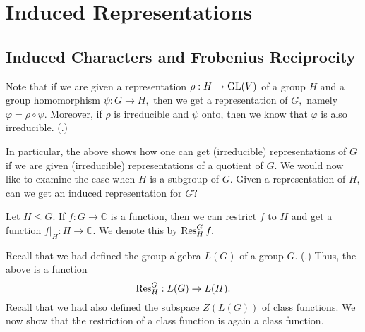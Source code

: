 \section{Induced Representations}
\subsection{Induced Characters and Frobenius Reciprocity}

Note that if we are given a representation $\rho : H \to \operatorname{GL}(V)$ of a group $H$ and a group homomorphism $\psi : G \to H,$ then we get a representation of $G,$ namely $\varphi = \rho \circ \psi.$ Moreover, if $\rho$ is irreducible and $\psi$ onto, then we know that $\varphi$ is also irreducible. (.) 

In particular, the above shows how one can get (irreducible) representations of $G$ if we are given (irreducible) representations of a quotient of $G.$ We would now like to examine the case when $H$ is a subgroup of $G.$ Given a representation of $H,$ can we get an induced representation for $G?$

\begin{defn}%
	Let $H \le G.$ If $f : G \to \mathbb{C}$ is a function, then we can restrict $f$ to $H$ and get a function $f|_H : H \to \mathbb{C}.$ We denote this  by $\operatorname{Res}^{G}_{H}f.$
\end{defn}

Recall that we had defined the group algebra $L(G)$ of a group $G.$ (.) Thus, the above is a function
\begin{equation*} 
	\operatorname{Res}^{G}_{H} : L(G) \to L(H).
\end{equation*}
Recall that we had also defined the subspace $Z(L(G))$ of class functions. We now show that the restriction of a class function is again a class function.

